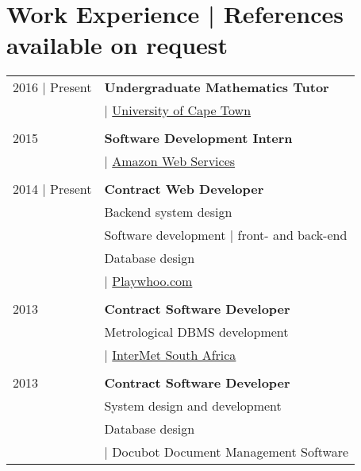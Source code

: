 \section{Work Experience \footnotesize | References available on request}

\begin{tabular}{R{2.5cm}|l}

2016 | Present & \textbf{Undergraduate Mathematics Tutor}\\
               & | \href{http://uct.ac.za}{University of Cape Town}\\
               & \\

2015           & \textbf{Software Development Intern }\\
               & | \href{https://aws.amazon.com}{Amazon Web Services}\\
               & \\

2014 | Present & \textbf{Contract Web Developer}\\
               & Backend system design\\
               & Software development | front- and  back-end\\
               & Database design\\
               & | \href{https://playwhoo.com}{Playwhoo.com}\\
               & \\

2013           & \textbf{Contract Software Developer}\\
               & Metrological DBMS development\\
               & | \href{http://www.diel.co.za}{InterMet South Africa}\\
               & \\

2013           & \textbf{Contract Software Developer}\\
               & System design and development\\
               & Database design\\
               & | Docubot Document Management Software
\end{tabular}

